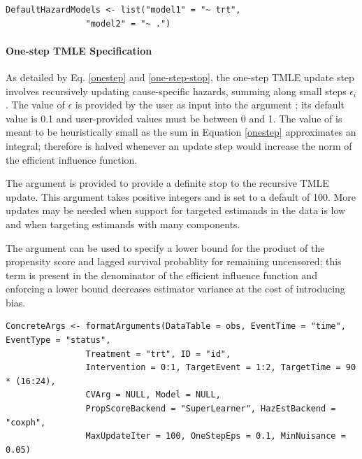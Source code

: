 \documentclass{report}
\newcommand{\1}{\ensuremath{\mathbf{1}}}
\begin{document}
\begin{lstlisting}
DefaultHazardModels <- list("model1" = "~ trt", 
			    "model2" = "~ .")
\end{lstlisting}

\paragraph{One-step TMLE Specification}
\label{tmle-specification}
As detailed by Eq. \eqref{onestep} and \eqref{one-step-stop}, the one-step TMLE update step involves recursively updating cause-specific hazards, summing along small steps \(\epsilon_i\). The value of \(\epsilon\) is provided by the user as input into the argument ; its default value is 0.1 and user-provided values must be between 0 and 1. The value of  is meant to be heuristically small as the sum in Equation \eqref{onestep} approximates an integral; therefore  is halved whenever an update step would increase the norm of the efficient influence function.

The  argument is provided to provide a definite stop to the recursive TMLE update. This argument takes positive integers and is set to a default of 100. More updates may be needed when support for targeted estimands in the data is low and when targeting estimands with many components.

The argument  can be used to specify a lower bound for the product of the propensity score and lagged survival probablity for remaining uncensored; this term is present in the denominator of the efficient influence function and enforcing a lower bound decreases estimator variance at the cost of introducing bias. 

\begin{lstlisting}
ConcreteArgs <- formatArguments(DataTable = obs, EventTime = "time", EventType = "status", 
				Treatment = "trt", ID = "id", 
				Intervention = 0:1, TargetEvent = 1:2, TargetTime = 90 * (16:24), 
				CVArg = NULL, Model = NULL, 
				PropScoreBackend = "SuperLearner", HazEstBackend = "coxph", 
				MaxUpdateIter = 100, OneStepEps = 0.1, MinNuisance = 0.05)
\end{lstlisting}
\end{document}
